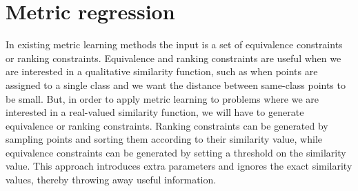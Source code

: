 \documentclass[a4paper,titlepage]{article}
\begin{document}
%

\pagebreak
\section{Metric regression}
\label{metric_regression}


In existing metric learning methods the input is a set of equivalence constraints or ranking constraints. Equivalence and ranking constraints are useful when we are interested in a qualitative similarity function, such as when points are assigned to a single class and we want the distance between same-class points to be small. But, in order to apply metric learning to problems where we are interested in a real-valued similarity function, we will have to generate equivalence or ranking constraints. Ranking constraints can be generated by sampling points and sorting them according to their similarity value, while equivalence constraints can be generated by setting a threshold on the similarity value. This approach introduces extra parameters and ignores the exact similarity values, thereby throwing away useful information.

\end{document}
